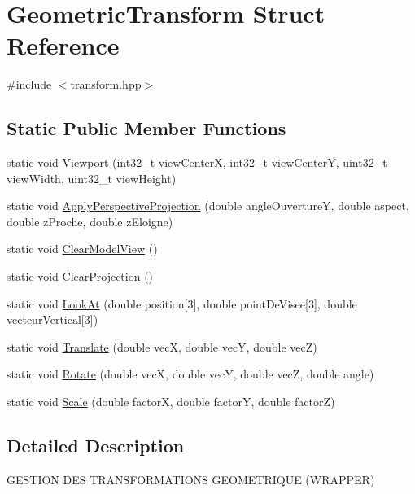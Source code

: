 \hypertarget{struct_geometric_transform}{}\section{Geometric\+Transform Struct Reference}
\label{struct_geometric_transform}


{\ttfamily \#include $<$transform.\+hpp$>$}

\subsection*{Static Public Member Functions}
\begin{DoxyCompactItemize}
\item 
static void \hyperlink{struct_geometric_transform_a568c9eddb625b6d6a8e513efed1f08f5}{Viewport} (int32\+\_\+t view\+CenterX, int32\+\_\+t view\+CenterY, uint32\+\_\+t view\+Width, uint32\+\_\+t view\+Height)
\item 
static void \hyperlink{struct_geometric_transform_a33174eb94f0ff24be29b8704c8ee99fd}{Apply\+Perspective\+Projection} (double angle\+OuvertureY, double aspect, double z\+Proche, double z\+Eloigne)
\item 
static void \hyperlink{struct_geometric_transform_a1a64fda32bc67f6e414a08b55a904ad6}{Clear\+Model\+View} ()
\item 
static void \hyperlink{struct_geometric_transform_aa67fe82887937c72ee486521a3828c51}{Clear\+Projection} ()
\item 
static void \hyperlink{struct_geometric_transform_a11df6454b17b6ed7a9327cfd837cef0d}{Look\+At} (double position\mbox{[}3\mbox{]}, double point\+De\+Visee\mbox{[}3\mbox{]}, double vecteur\+Vertical\mbox{[}3\mbox{]})
\item 
static void \hyperlink{struct_geometric_transform_aa1ce970125c307eae8e67732abfc2223}{Translate} (double vecX, double vecY, double vecZ)
\item 
static void \hyperlink{struct_geometric_transform_a6d5739ab72a5de90da8992dfb9d73cf2}{Rotate} (double vecX, double vecY, double vecZ, double angle)
\item 
static void \hyperlink{struct_geometric_transform_a86dfbf0890a23aa7983b64cbd9fe6fd5}{Scale} (double factorX, double factorY, double factorZ)
\end{DoxyCompactItemize}


\subsection{Detailed Description}
G\+E\+S\+T\+I\+ON D\+ES T\+R\+A\+N\+S\+F\+O\+R\+M\+A\+T\+I\+O\+NS G\+E\+O\+M\+E\+T\+R\+I\+Q\+UE (W\+R\+A\+P\+P\+ER) 

